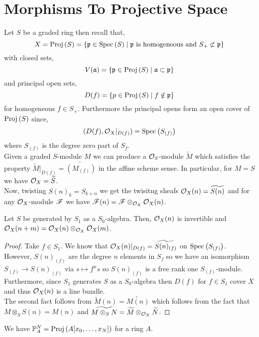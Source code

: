 \documentclass[12pt]{article}
\begin{document}
\section{Morphisms To Projective Space}

\begin{remark}
Let $S$ be a graded ring then recall that,
\[ X = \mathrm{Proj}\left( S \right) = \{ \mathfrak{p} \in \mathrm{Spec}\left( S \right) \mid \mathfrak{p} \text{ is homogeneous and } S_+ \not \subset \mathfrak{p} \} \]
with closed sets,
\[ V(\mathfrak{a}) = \{ \mathfrak{p} \in \mathrm{Proj}\left( S \right) \mid \mathfrak{a} \subset \mathfrak{p} \} \]
and principal open sets,
\[ D(f) = \{ p \in \mathrm{Proj}\left( S \right) \mid f \notin \mathfrak{p} \} \]
for homogeneous $f \in S_+$.
Furthermore the principal opens form an open cover of $\mathrm{Proj}\left( S \right)$ since,
\[ (D(f), \mathcal{O}_{X}|_{D(f)}) = \mathrm{Spec}\left( S_{(f)} \right) \]
where $S_{(f)}$ is the degree zero part of $S_f$.  
\bigskip\\
Given a graded $S$-module $M$ we can produce a $\mathcal{O}_{S}$-module $\widetilde{M}$ which satisfies the property $\widetilde{M} |_{D(f)} = \widetilde{(M_{(f)})}$ in the affine scheme sense. In particular, for $M = S$ we have $\mathcal{O}_{X} = \widetilde{S}$.
\bigskip\\
Now, twisting $S(n)_k = S_{k + n}$ we get the twisitng sheafs $\mathcal{O}_{X}(n) = \widetilde{S(n)}$ and for any $\mathcal{O}_{X}$-module $\mathscr{F}$ we have $\mathscr{F}(n) = \mathscr{F} \otimes_{\mathcal{O}_{X}} \mathcal{O}_{X}(n)$.
\end{remark}

\begin{proposition}
Let $S$ be generated by $S_1$ as a $S_0$-algebra. Then, $\mathcal{O}_{X}(n)$ is invertible and $\mathcal{O}_{X}(n + m) = \mathcal{O}_{X}(n) \otimes_{\mathcal{O}_{X}} \mathcal{O}_{X}(m)$. 
\end{proposition}

\begin{proof}
Take $f \in S_1$. We know that $\mathcal{O}_{X}(n)|_{D(f)} = \widetilde{S(n)_{(f)}}$ on $\mathrm{Spec}\left( S_{(f)} \right)$. However, $S(n)_{(f)}$ are the degree $n$ elements in $S_f$ so we have an isomorphism $S_(f) \to S(n)_{(f)}$ via $s \mapsto f^n s$ so $S(n)_{(f)}$ is a free rank one $S_{(f)}$-module. Furthermore, since $S_1$ generates $S$ as a $S_0$-algebra then $D(f)$ for $f \in S_1$ cover $X$ and thus $\mathcal{O}_{X}(n)$ is a line bundle.
\bigskip\\
The second fact follows from $\widetilde{M}(n) = \widetilde{M(n)}$ which follows from the fact that $M \otimes_S S(n) = M(n)$ and $\widetilde{M \otimes_S N} = \widetilde{M} \otimes_{\mathcal{O}_{X}} \widetilde{N}$. 
\end{proof}

\begin{definition}
We have $\mathbb{P}^N_A = \mathrm{Proj}\left( A[x_0, \dots, x_N] \right)$ for a ring $A$.
\end{definition}
\end{document}
